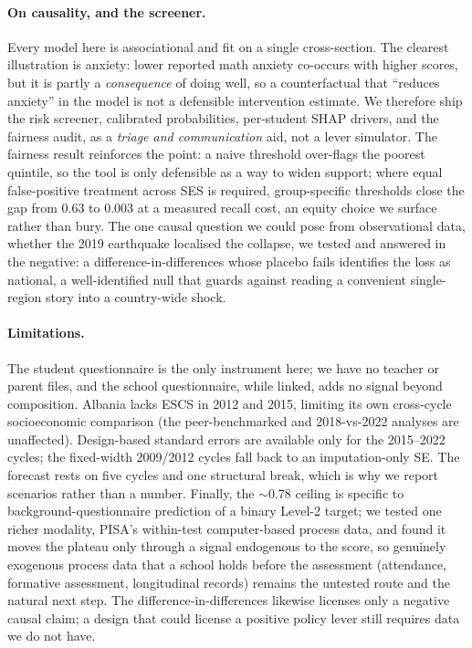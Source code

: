 \paragraph{On causality, and the screener.}
Every model here is associational and fit on a single cross-section. The clearest
illustration is anxiety: lower reported math anxiety co-occurs with higher scores, but
it is partly a \emph{consequence} of doing well, so a counterfactual that ``reduces
anxiety'' in the model is not a defensible intervention estimate. We therefore ship the
risk screener, calibrated probabilities, per-student SHAP drivers, and the fairness
audit, as a \emph{triage and communication} aid, not a lever simulator. The fairness
result reinforces the point: a naive threshold over-flags the poorest quintile, so the
tool is only defensible as a way to widen support; where equal false-positive treatment
across SES is required, group-specific thresholds close the gap from 0.63 to 0.003 at a
measured recall cost, an equity choice we surface rather than bury. The one causal
question we could pose from observational data, whether the 2019 earthquake localised
the collapse, we tested and answered in the negative: a difference-in-differences whose
placebo fails identifies the loss as national, a well-identified null that guards
against reading a convenient single-region story into a country-wide shock.

\paragraph{Limitations.}
The student questionnaire is the only instrument here; we have no teacher or parent
files, and the school questionnaire, while linked, adds no signal beyond composition.
Albania lacks ESCS in 2012 and 2015, limiting its own cross-cycle socioeconomic
comparison (the peer-benchmarked and 2018-vs-2022 analyses are unaffected). Design-based
standard errors are available only for the 2015--2022 cycles; the fixed-width 2009/2012
cycles fall back to an imputation-only SE. The forecast rests on five cycles and one
structural break, which is why we report scenarios rather than a number. Finally, the
$\sim$0.78 ceiling is specific to background-questionnaire prediction of a binary
Level-2 target; we tested one richer modality, PISA's within-test computer-based
process data, and found it moves the plateau only through a signal endogenous to the
score, so genuinely exogenous process data that a school holds before the assessment
(attendance, formative assessment, longitudinal records) remains the untested route and
the natural next step. The difference-in-differences likewise licenses only a negative
causal claim; a design that could license a positive policy lever still requires data we
do not have.
